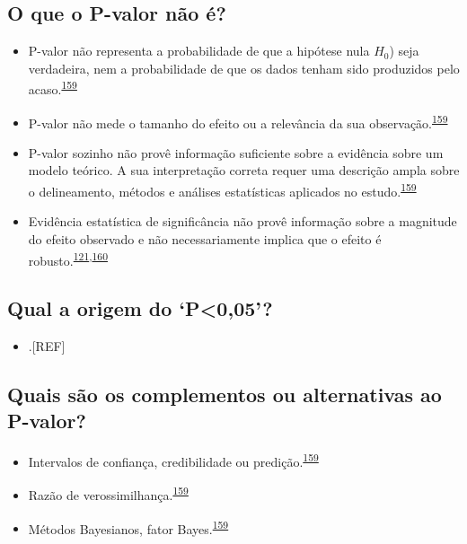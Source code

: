 \documentclass[
  a4paper,
]{book}
\providecommand{\tightlist}{%
  \setlength{\itemsep}{0pt}\setlength{\parskip}{0pt}}
\begin{document}
\hypertarget{o-que-o-p-valor-nuxe3o-uxe9}{%
\subsection{O que o P-valor não é?}\label{o-que-o-p-valor-nuxe3o-uxe9}}

\begin{itemize}
\item
  P-valor não representa a probabilidade de que a hipótese nula \(H_{0}\)) seja verdadeira, nem a probabilidade de que os dados tenham sido produzidos pelo acaso.\textsuperscript{\protect\hyperlink{ref-wasserstein2016}{159}}
\item
  P-valor não mede o tamanho do efeito ou a relevância da sua observação.\textsuperscript{\protect\hyperlink{ref-wasserstein2016}{159}}
\item
  P-valor sozinho não provê informação suficiente sobre a evidência sobre um modelo teórico. A sua interpretação correta requer uma descrição ampla sobre o delineamento, métodos e análises estatísticas aplicados no estudo.\textsuperscript{\protect\hyperlink{ref-wasserstein2016}{159}}
\item
  Evidência estatística de significância não provê informação sobre a magnitude do efeito observado e não necessariamente implica que o efeito é robusto.\textsuperscript{\protect\hyperlink{ref-Landis2012}{121},\protect\hyperlink{ref-altman2017}{160}}
\end{itemize}

\hypertarget{qual-a-origem-do-p005}{%
\subsection{Qual a origem do `P\textless0,05'?}\label{qual-a-origem-do-p005}}

\begin{itemize}
\tightlist
\item
  .{[}REF{]}
\end{itemize}

\hypertarget{quais-suxe3o-os-complementos-ou-alternativas-ao-p-valor}{%
\subsection{Quais são os complementos ou alternativas ao P-valor?}\label{quais-suxe3o-os-complementos-ou-alternativas-ao-p-valor}}

\begin{itemize}
\item
  Intervalos de confiança, credibilidade ou predição.\textsuperscript{\protect\hyperlink{ref-wasserstein2016}{159}}
\item
  Razão de verossimilhança.\textsuperscript{\protect\hyperlink{ref-wasserstein2016}{159}}
\item
  Métodos Bayesianos, fator Bayes.\textsuperscript{\protect\hyperlink{ref-wasserstein2016}{159}}
\end{itemize}
\end{document}
